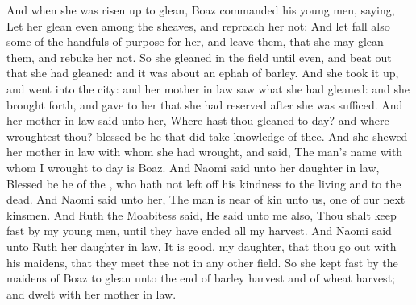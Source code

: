 \begin{biblechapter}
\verse And when she was risen up to glean, Boaz commanded his young men, saying, Let her glean even among the sheaves, and reproach her not:
\verse And let fall also some of the handfuls of purpose for her, and leave them, that she may glean them, and rebuke her not.
\verse So she gleaned in the field until even, and beat out that she had gleaned: and it was about an ephah of barley.
\verse And she took it up, and went into the city: and her mother in law saw what she had gleaned: and she brought forth, and gave to her that she had reserved after she was sufficed.
\verse And her mother in law said unto her, Where hast thou gleaned to day? and where wroughtest thou? blessed be he that did take knowledge of thee. And she shewed her mother in law with whom she had wrought, and said, The man's name with whom I wrought to day is Boaz.
\verse And Naomi said unto her daughter in law, Blessed be he of the \LORD, who hath not left off his kindness to the living and to the dead. And Naomi said unto her, The man is near of kin unto us, one of our next kinsmen.
\verse And Ruth the Moabitess said, He said unto me also, Thou shalt keep fast by my young men, until they have ended all my harvest.
\verse And Naomi said unto Ruth her daughter in law, It is good, my daughter, that thou go out with his maidens, that they meet thee not in any other field.
\verse So she kept fast by the maidens of Boaz to glean unto the end of barley harvest and of wheat harvest; and dwelt with her mother in law.
\end{biblechapter}

